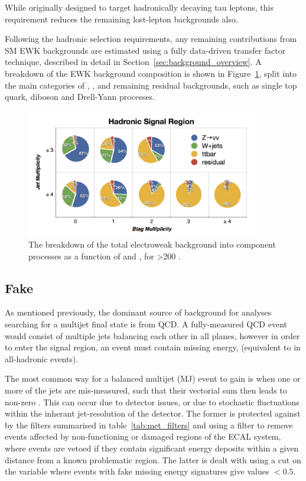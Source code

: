 While originally designed to target hadronically decaying tau leptons, 
this requirement reduces the remaining lost-lepton backgrounds also.

Following the hadronic selection requirements,
any remaining contributions from SM EWK backgrounds are estimated using a 
fully data-driven transfer factor technique, described in detail in
Section~\ref{sec:background_overview}. A breakdown of the EWK background 
composition is shown in Figure~\ref{fig:background_decomp}, split into the main 
categories of \zinv, \wj, \ttbar and remaining residual backgrounds, such as
single top quark, diboson and Drell-Yann processes.

\begin{figure}[hb!]
\centering
\hspace{0cm}\includegraphics[width=0.9\textwidth, trim=0 00 0 0, clip=true]
{Figs/ra1_had_bg_comp_v3.png}
\caption{The breakdown of the total electroweak background into component
processes as a function of \nj and \nb, for \HT>200 \gev.}
\label{fig:background_decomp}
\end{figure}

\subsection{Fake \met}

As mentioned previously, the dominant source of background for analyses 
searching for a multijet final state is from QCD. A fully-measured QCD event 
would consist of multiple jets balancing each other in all planes, however in 
order to enter the signal region, an event must contain missing energy, 
\mht (equivalent to \met in all-hadronic events).

The most common way for a balanced multijet (MJ) event to gain \mht is when one 
or more of the jets are mis-measured, such that their vectorial sum then leads to non-zero
\mht. This can occur due to detector issues, or due to stochastic fluctuations
within
the inherant jet-resolution of the 
detector. The former is protected against by the \met filters summarised in 
table~\ref{tab:met_filters} and using a filter to remove events
affected by non-functioning or damaged regions of the ECAL system, where 
events are vetoed if they contain significant energy deposits within a given 
distance from a known problematic region. The latter is dealt with using a
cut on the \alphat variable where 
events with fake missing energy signatures give values $<0.5$.


